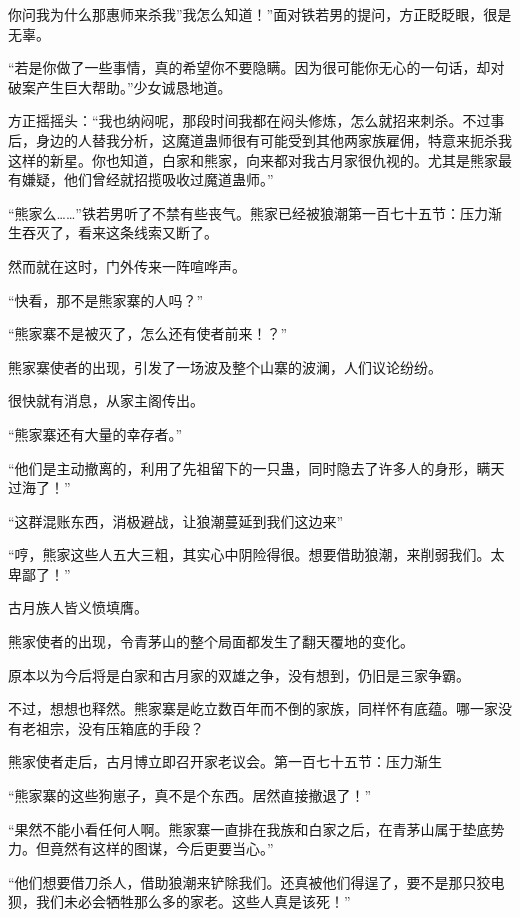 
\begin{this_body}

你问我为什么那惠师来杀我”我怎么知道！”面对铁若男的提问，方正眨眨眼，很是无辜。

“若是你做了一些事情，真的希望你不要隐瞒。因为很可能你无心的一句话，却对破案产生巨大帮助。”少女诚恳地道。

方正摇摇头：“我也纳闷呢，那段时间我都在闷头修炼，怎么就招来刺杀。不过事后，身边的人替我分析，这魔道蛊师很有可能受到其他两家族雇佣，特意来扼杀我这样的新星。你也知道，白家和熊家，向来都对我古月家很仇视的。尤其是熊家最有嫌疑，他们曾经就招揽吸收过魔道蛊师。”

“熊家么……”铁若男听了不禁有些丧气。熊家已经被狼潮第一百七十五节：压力渐生吞灭了，看来这条线索又断了。

然而就在这时，门外传来一阵喧哗声。

“快看，那不是熊家寨的人吗？”

“熊家寨不是被灭了，怎么还有使者前来！？”

熊家寨使者的出现，引发了一场波及整个山寨的波澜，人们议论纷纷。

很快就有消息，从家主阁传出。

“熊家寨还有大量的幸存者。”

“他们是主动撤离的，利用了先祖留下的一只蛊，同时隐去了许多人的身形，瞒天过海了！”

“这群混账东西，消极避战，让狼潮蔓延到我们这边来”

“哼，熊家这些人五大三粗，其实心中阴险得很。想要借助狼潮，来削弱我们。太卑鄙了！”

古月族人皆义愤填膺。

熊家使者的出现，令青茅山的整个局面都发生了翻天覆地的变化。

原本以为今后将是白家和古月家的双雄之争，没有想到，仍旧是三家争霸。

不过，想想也释然。熊家寨是屹立数百年而不倒的家族，同样怀有底蕴。哪一家没有老祖宗，没有压箱底的手段？

熊家使者走后，古月博立即召开家老议会。第一百七十五节：压力渐生

“熊家寨的这些狗崽子，真不是个东西。居然直接撤退了！”

“果然不能小看任何人啊。熊家寨一直排在我族和白家之后，在青茅山属于垫底势力。但竟然有这样的图谋，今后更要当心。”

“他们想要借刀杀人，借助狼潮来铲除我们。还真被他们得逞了，要不是那只狡电狈，我们未必会牺牲那么多的家老。这些人真是该死！”


\end{this_body}
